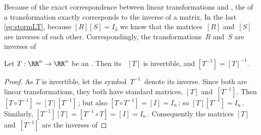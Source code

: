 Because of the exact correspondence between linear transformations and , the  of a transformation exactly corresponds to the inverse of a matrix.
In the last \cref{eg:stormLT}, because \([R][S]=I_3\) we know that the matrices~\([R]\) and~\([S]\) are inverses of each other. 
Correspondingly, the transformations~\(R\) and~\(S\) are inverses of 




\begin{theorem} \label{thm:invsm} 
Let \(T:\RR^n\to\RR^n\) be an  . 
Then its ~\([T]\) is invertible, and \([T^{-1}]=[T]^{-1}\). 
\end{theorem}
\begin{proof} 
As \(T\) is invertible,  let the symbol~\(T^{-1}\)~denote its inverse.
Since both are linear transformations, they both have standard matrices, \([T]\) and~\([T^{-1}]\).
Then \([T\circ T^{-1}]=[T][T^{-1}]\)\,; but also \([T\circ T^{-1}]=[I]=I_n\)\,; so \([T][T^{-1}]=I_n\)\,.
Similarly, \([T^{-1}][T]=[T^{-1}\circ T]=[I]=I_n\)\,.
Consequently the matrices \([T]\) and~\([T^{-1}]\) are the inverses of 
\end{proof}

